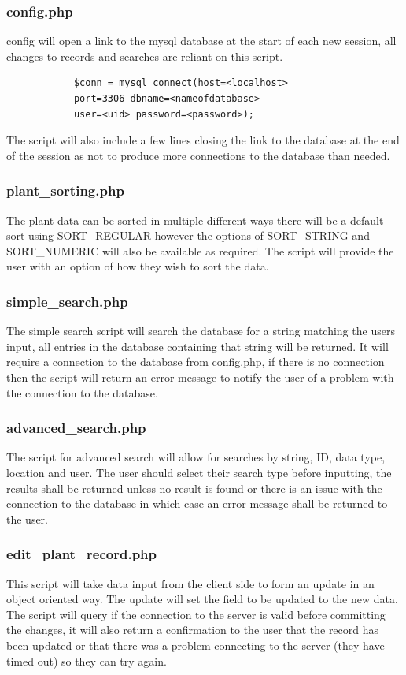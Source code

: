 	\subsubsection{config.php}
		config will open a link to the mysql database at the start of each new session, all changes to records and searches are reliant on this script.
		\begin{verbatim}
			$conn = mysql_connect(host=<localhost> 
			port=3306 dbname=<nameofdatabase> 
			user=<uid> password=<password>);
		\end{verbatim}
		The script will also include a few lines closing the link to the database at the end of the session as not to produce more connections to the database than needed.

	\subsubsection{plant\_sorting.php}
		The plant data can be sorted in multiple different ways there will be a default sort using SORT\_REGULAR however the options of SORT\_STRING and SORT\_NUMERIC will also be available as required. The script will provide the user with an option of how they wish to sort the data.

	\subsubsection{simple\_search.php}
		The simple search script will search the database for a string matching the users input, all entries in the database containing that string will be returned. It will require a connection to the database from config.php, if there is no connection then the script will return an error message to notify the user of a problem with the connection to the database.

	\subsubsection{advanced\_search.php}
		The script for advanced search will allow for searches by string, ID, data type, location and user. The user should select their search type before inputting, the results shall be returned unless no result is found or there is an issue with the connection to the database in which case an error message shall be returned to the user. 

	\subsubsection{edit\_plant\_record.php}
		This script will take data input from the client side to form an update in an object oriented way. The update will set the field to be updated to the new data. The script will query if the connection to the server is valid before committing the changes, it will also return a confirmation to the user that the record has been updated or that there was a problem connecting to the server (they have timed out) so they can try again.

